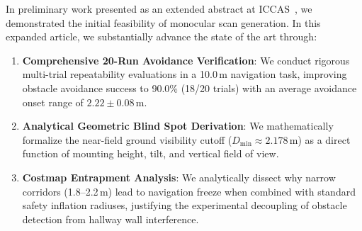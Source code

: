 In preliminary work presented as an extended abstract at ICCAS~\cite{lee2025vision_iccas}, we demonstrated the initial feasibility of monocular scan generation. In this expanded article, we substantially advance the state of the art through:
\begin{enumerate}
    \item \textbf{Comprehensive 20-Run Avoidance Verification}: We conduct rigorous multi-trial repeatability evaluations in a 10.0\,m navigation task, improving obstacle avoidance success to 90.0\% (18/20 trials) with an average avoidance onset range of $2.22 \pm 0.08\,\text{m}$.
    \item \textbf{Analytical Geometric Blind Spot Derivation}: We mathematically formalize the near-field ground visibility cutoff ($D_{\text{min}} \approx 2.178\,\text{m}$) as a direct function of mounting height, tilt, and vertical field of view.
    \item \textbf{Costmap Entrapment Analysis}: We analytically dissect why narrow corridors (1.8--2.2\,m) lead to navigation freeze when combined with standard safety inflation radiuses, justifying the experimental decoupling of obstacle detection from hallway wall interference.
\end{enumerate}
